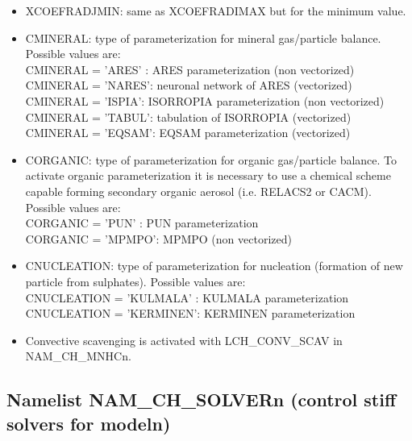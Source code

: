 \begin{itemize}
\item  XCOEFRADJMIN: same as XCOEFRADIMAX but for the minimum value.
\item  CMINERAL: type of parameterization for mineral gas/particle balance. Possible values are:\\
CMINERAL = 'ARES' : ARES parameterization (non vectorized) \\
CMINERAL = 'NARES': neuronal network of ARES (vectorized) \\
CMINERAL = 'ISPIA': ISORROPIA parameterization (non vectorized) \\
CMINERAL = 'TABUL': tabulation of ISORROPIA  (vectorized) \\
CMINERAL = 'EQSAM': EQSAM parameterization (vectorized) 

\item  CORGANIC: type of parameterization for organic gas/particle balance. To activate organic parameterization it is necessary to use a chemical scheme capable forming secondary organic aerosol (i.e. RELACS2 or CACM). Possible values are:\\
CORGANIC = 'PUN' : PUN parameterization  \\
CORGANIC = 'MPMPO': MPMPO (non vectorized) 

\item  CNUCLEATION: type of parameterization for nucleation (formation of new particle from sulphates). Possible values are:\\
CNUCLEATION = 'KULMALA' : KULMALA parameterization \\  
CNUCLEATION = 'KERMINEN': KERMINEN parameterization  

\item Convective scavenging is activated with LCH\_CONV\_SCAV in NAM\_CH\_MNHCn.

\end{itemize}


\subsection{Namelist NAM\_CH\_SOLVERn (control stiff solvers for modeln)}
 
